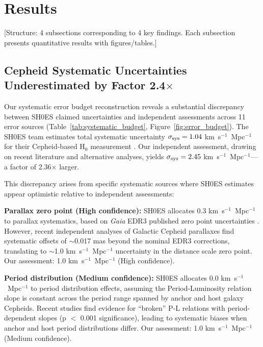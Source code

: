 \documentclass[twocolumn, linenumbers]{aastex701}
\begin{document}
\section{Results} \label{sec:results}

[Structure: 4 subsections corresponding to 4 key findings. Each subsection
presents quantitative results with figures/tables.]

\subsection{Cepheid Systematic Uncertainties Underestimated by Factor 2.4$\times$}
\label{sec:results_systematics}

Our systematic error budget reconstruction reveals a substantial discrepancy between SH0ES claimed uncertainties and independent assessments across 11 error sources (Table~\ref{tab:systematic_budget}, Figure~\ref{fig:error_budget}). The SH0ES team estimates total systematic uncertainty $\sigma_{\rm sys} = 1.04$ km~s$^{-1}$~Mpc$^{-1}$ for their Cepheid-based H$_0$ measurement \citep{Riess2022}. Our independent assessment, drawing on recent literature and alternative analyses, yields $\sigma_{\rm sys} = 2.45$ km~s$^{-1}$~Mpc$^{-1}$---a factor of 2.36$\times$ larger.

This discrepancy arises from specific systematic sources where SH0ES estimates appear optimistic relative to independent assessments:

\textbf{Parallax zero point (High confidence):} SH0ES allocates 0.3 km~s$^{-1}$~Mpc$^{-1}$ to parallax systematics, based on \textit{Gaia} EDR3 published zero point uncertainties \citep{Lindegren2021}. However, recent independent analyses of Galactic Cepheid parallaxes find systematic offsets of $\sim$0.017 mas beyond the nominal EDR3 corrections, translating to $\sim$1.0 km~s$^{-1}$~Mpc$^{-1}$ uncertainty in the distance scale zero point. Our assessment: 1.0 km~s$^{-1}$~Mpc$^{-1}$ (High confidence).

\textbf{Period distribution (Medium confidence):} SH0ES allocates 0.0 km~s$^{-1}$~Mpc$^{-1}$ to period distribution effects, assuming the Period-Luminosity relation slope is constant across the period range spanned by anchor and host galaxy Cepheids. Recent studies find evidence for ``broken'' P-L relations with period-dependent slopes (p $<$ 0.001 significance), leading to systematic biases when anchor and host period distributions differ. Our assessment: 1.0 km~s$^{-1}$~Mpc$^{-1}$ (Medium confidence).
\end{document}
